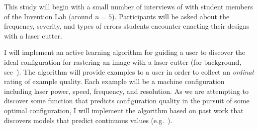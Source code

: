 \documentclass[12pt]{article}
\begin{document}




This study will begin with a small number of interviews of with student members of the Invention Lab (around $n=5$).
Participants will be asked about the frequency, severity, and types of errors students encounter enacting their designs with a laser cutter.

I will implement an active learning algorithm for guiding a user to discover the ideal configuration for rastering an image with a laser cutter (for background, see~\cite{settles_active_2010}).
The algorithm will provide examples to a user in order to collect an \emph{ordinal} rating of example quality.
Each example will be a machine configuration including laser power, speed, frequency, and resolution.
As we are attempting to discover some function that predicts configuration quality in the pursuit of some optimal configuration, I will implement the algorithm based on past work that discovers models that predict continuous values (e.g.~\cite{sugiyama_active_2008}).
\end{document}
